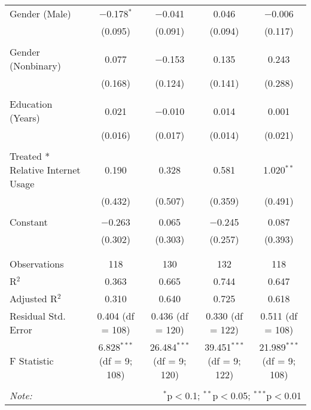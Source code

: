 \begin{table}[!htbp]
\begin{tabular}{@{\extracolsep{5pt}}lcccc}
 Gender (Male) & $-$0.178$^{*}$ & $-$0.041 & 0.046 & $-$0.006 \\ 
  & (0.095) & (0.091) & (0.094) & (0.117) \\ 
  & & & & \\ 
 Gender (Nonbinary) & 0.077 & $-$0.153 & 0.135 & 0.243 \\ 
  & (0.168) & (0.124) & (0.141) & (0.288) \\ 
  & & & & \\ 
 Education (Years) & 0.021 & $-$0.010 & 0.014 & 0.001 \\ 
  & (0.016) & (0.017) & (0.014) & (0.021) \\ 
  & & & & \\ 
 Treated * Relative Internet Usage & 0.190 & 0.328 & 0.581 & 1.020$^{**}$ \\ 
  & (0.432) & (0.507) & (0.359) & (0.491) \\ 
  & & & & \\ 
 Constant & $-$0.263 & 0.065 & $-$0.245 & 0.087 \\ 
  & (0.302) & (0.303) & (0.257) & (0.393) \\ 
  & & & & \\ 
\hline \\[-1.8ex] 
Observations & 118 & 130 & 132 & 118 \\ 
R$^{2}$ & 0.363 & 0.665 & 0.744 & 0.647 \\ 
Adjusted R$^{2}$ & 0.310 & 0.640 & 0.725 & 0.618 \\ 
Residual Std. Error & 0.404 (df = 108) & 0.436 (df = 120) & 0.330 (df = 122) & 0.511 (df = 108) \\ 
F Statistic & 6.828$^{***}$ (df = 9; 108) & 26.484$^{***}$ (df = 9; 120) & 39.451$^{***}$ (df = 9; 122) & 21.989$^{***}$ (df = 9; 108) \\ 
\hline 
\hline \\[-1.8ex] 
\textit{Note:}  & \multicolumn{4}{r}{$^{*}$p$<$0.1; $^{**}$p$<$0.05; $^{***}$p$<$0.01} \\ 
\end{tabular} 
\end{table} 
